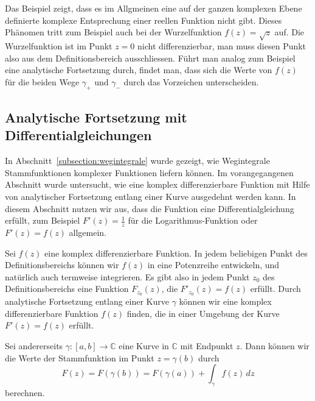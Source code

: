Das Beispiel zeigt, dass es im Allgmeinen eine auf der ganzen komplexen
Ebene definierte komplexe Entsprechung einer reellen Funktion nicht gibt.
Dieses Phänomen tritt zum Beispiel auch bei der Wurzelfunktion
$f(z)=\sqrt{z}$ auf.
Die Wurzelfunktion ist im Punkt $z=0$ nicht differenzierbar, man muss diesen
Punkt also aus dem Definitionsbereich ausschliessen.
Führt man analog zum Beispiel eine analytische Fortsetzung durch,
findet man, dass sich die Werte von $f(z)$ für die beiden Wege $\gamma_+$
und $\gamma_-$ durch das Vorzeichen unterscheiden.

%
%
\subsection{Analytische Fortsetzung mit Differentialgleichungen
\label{komplex:analytische-fortsetzung-dgl}}
In Abschnitt~\ref{subsection:wegintegrale} wurde gezeigt, wie Wegintegrale
Stammfunktionen komplexer Funktionen liefern können.
Im vorangegangenen Abschnitt wurde untersucht, wie eine komplex differenzierbare
Funktion mit Hilfe von analytischer Fortsetzung entlang einer Kurve
ausgedehnt werden kann.
In diesem Abschnitt nutzen wir aus, dass die Funktion
eine Differentialgleichung erfüllt, zum Beispiel $F'(z)=\frac{1}{z}$
für die Logarithmus-Funktion oder $F'(z)=f(z)$ allgemein.

Sei $f(z)$ eine komplex differenzierbare Funktion.
In jedem beliebigen Punkt des Definitionsbereichs können wir $f(z)$
in eine Potenzreihe entwickeln, und natürlich auch termweise integrieren.
Es gibt also in jedem Punkt $z_0$ des Definitionsbereichs eine
Funktion $F_{z_0}(z)$, die $F'_{z_0}(z)=f(z)$ erfüllt.
Durch analytische Fortsetzung entlang einer Kurve $\gamma$ können
wir eine komplex differenzierbare Funktion $f(z)$ finden, die in einer
Umgebung der Kurve $F'(z)=f(z)$ erfüllt.

Sei andererseits $\gamma\colon[a,b]\to\mathbb C$ eine Kurve in $\mathbb C$
mit Endpunkt $z$.
Dann können wir die Werte der Stammfunktion im Punkt $z=\gamma(b)$ durch
\[
F(z) = F(\gamma(b)) = F(\gamma(a))+\int_\gamma f(z)\,dz
\]
berechnen.

